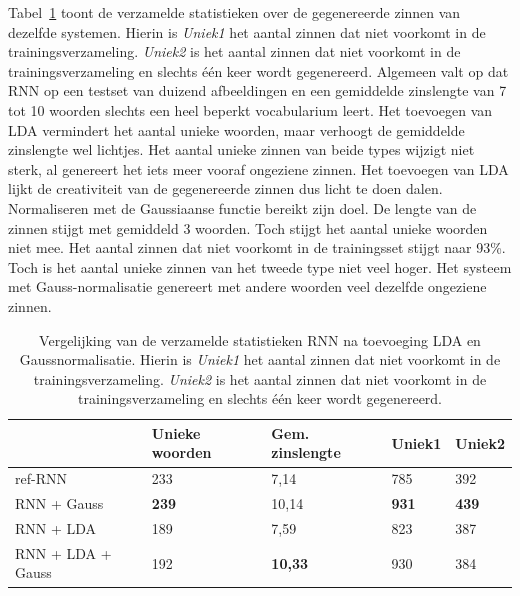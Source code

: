 Tabel~\ref{table:rnn_lda_stats} toont de verzamelde statistieken over de gegenereerde zinnen van dezelfde systemen. Hierin is \emph{Uniek1} het aantal zinnen dat niet voorkomt in de trainingsverzameling. \emph{Uniek2} is het aantal zinnen dat niet voorkomt in de trainingsverzameling en slechts \'e\'en keer wordt gegenereerd.
Algemeen valt op dat RNN op een testset van duizend afbeeldingen en een gemiddelde zinslengte van 7 tot 10 woorden slechts een heel beperkt vocabularium leert.
Het toevoegen van LDA vermindert het aantal unieke woorden, maar verhoogt de gemiddelde zinslengte wel lichtjes. Het aantal unieke zinnen van beide types wijzigt niet sterk, al genereert het iets meer vooraf ongeziene zinnen. Het toevoegen van LDA lijkt de creativiteit van de gegenereerde zinnen dus licht te doen dalen.
Normaliseren met de Gaussiaanse functie bereikt zijn doel. De lengte van de zinnen stijgt met gemiddeld 3 woorden. Toch stijgt het aantal unieke woorden niet mee. Het aantal zinnen dat niet voorkomt in de trainingsset stijgt naar 93\%. Toch is het aantal unieke zinnen van het tweede type niet veel hoger. Het systeem met Gauss-normalisatie genereert met andere woorden veel dezelfde ongeziene zinnen.

\begin{table}
	\centering
	\begin{tabular}{lllll}
		~                 & Unieke woorden & Gem. zinslengte & Uniek1 & Uniek2 \\ \hline
		ref-RNN           & 233            & 7,14           & 785    & 392    \\
		RNN + Gauss       & \textbf{239}   & 10,14          & \textbf{931}    & \textbf{439}    \\
		RNN + LDA         & 189            & 7,59           & 823    & 387    \\
		RNN + LDA + Gauss & 192            & \textbf{10,33}          & 930    & 384    \\\hline
	\end{tabular}
	\caption[Vergelijking van de verzamelde statistieken RNN na toevoeging LDA en Gaussnormalisatie]{Vergelijking van de verzamelde statistieken RNN na toevoeging LDA en Gaussnormalisatie. Hierin is \emph{Uniek1} het aantal zinnen dat niet voorkomt in de trainingsverzameling. \emph{Uniek2} is het aantal zinnen dat niet voorkomt in de trainingsverzameling en slechts \'e\'en keer wordt gegenereerd.}
	\label{table:rnn_lda_stats}
\end{table}

